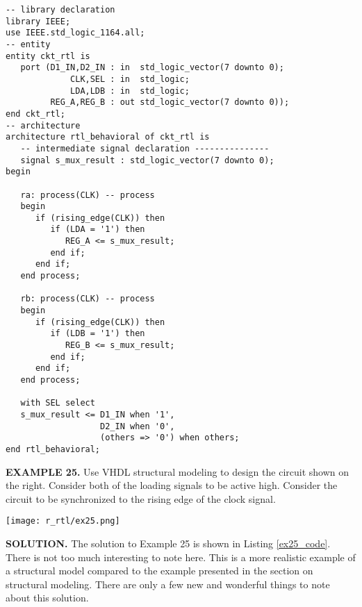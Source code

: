 \noindent
\begin{minipage}{0.99\linewidth}
\begin{lstlisting}[label=ex24_code, caption=Solution to Example 24.]
-- library declaration
library IEEE;
use IEEE.std_logic_1164.all;
-- entity
entity ckt_rtl is
   port (D1_IN,D2_IN : in  std_logic_vector(7 downto 0);
             CLK,SEL : in  std_logic; 
             LDA,LDB : in  std_logic; 
         REG_A,REG_B : out std_logic_vector(7 downto 0)); 
end ckt_rtl; 
-- architecture
architecture rtl_behavioral of ckt_rtl is 
   -- intermediate signal declaration ---------------
   signal s_mux_result : std_logic_vector(7 downto 0);
begin

   ra: process(CLK) -- process
   begin
      if (rising_edge(CLK)) then 
         if (LDA = '1') then 
            REG_A <= s_mux_result; 
         end if;
      end if;
   end process; 
	
   rb: process(CLK) -- process
   begin
      if (rising_edge(CLK)) then 
         if (LDB = '1') then 
            REG_B <= s_mux_result; 
         end if;
      end if;
   end process; 
	
   with SEL select
   s_mux_result <= D1_IN when '1', 
                   D2_IN when '0', 
                   (others => '0') when others; 
end rtl_behavioral;
\end{lstlisting}
\end{minipage}

\begin{leftbar}
\begin{minipage}[t]{0.5\textwidth}
\vspace{10pt}
\noindent
\textbf{EXAMPLE 25.}
Use VHDL structural modeling to design the circuit shown on the right. Consider both of the loading signals to be active high. Consider the circuit to be synchronized to the rising edge of the clock signal.
\end{minipage}
\begin{minipage}[t]{0.5\textwidth}
\vspace{0pt}\raggedright
    \centering
	\texttt{[image: r\_rtl/ex25.png]}
\end{minipage}
\end{leftbar}
\noindent
\textbf{SOLUTION.} The solution to Example 25 is shown in Listing \ref{ex25_code}. There is not too much interesting to note here. This is a more realistic example of a structural model compared to the example presented in the section on structural modeling. There are only a few new and wonderful things to note about this solution.

